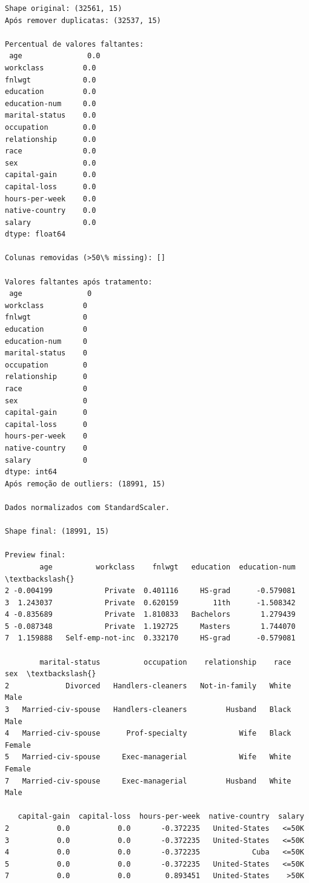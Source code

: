 \documentclass[11pt]{article}
\begin{document}
    \begin{Verbatim}[commandchars=\\\{\}]
Shape original: (32561, 15)
Após remover duplicatas: (32537, 15)

Percentual de valores faltantes:
 age               0.0
workclass         0.0
fnlwgt            0.0
education         0.0
education-num     0.0
marital-status    0.0
occupation        0.0
relationship      0.0
race              0.0
sex               0.0
capital-gain      0.0
capital-loss      0.0
hours-per-week    0.0
native-country    0.0
salary            0.0
dtype: float64

Colunas removidas (>50\% missing): []

Valores faltantes após tratamento:
 age               0
workclass         0
fnlwgt            0
education         0
education-num     0
marital-status    0
occupation        0
relationship      0
race              0
sex               0
capital-gain      0
capital-loss      0
hours-per-week    0
native-country    0
salary            0
dtype: int64
Após remoção de outliers: (18991, 15)

Dados normalizados com StandardScaler.

Shape final: (18991, 15)

Preview final:
        age          workclass    fnlwgt   education  education-num  \textbackslash{}
2 -0.004199            Private  0.401116     HS-grad      -0.579081
3  1.243037            Private  0.620159        11th      -1.508342
4 -0.835689            Private  1.810833   Bachelors       1.279439
5 -0.087348            Private  1.192725     Masters       1.744070
7  1.159888   Self-emp-not-inc  0.332170     HS-grad      -0.579081

        marital-status          occupation    relationship    race      sex  \textbackslash{}
2             Divorced   Handlers-cleaners   Not-in-family   White     Male
3   Married-civ-spouse   Handlers-cleaners         Husband   Black     Male
4   Married-civ-spouse      Prof-specialty            Wife   Black   Female
5   Married-civ-spouse     Exec-managerial            Wife   White   Female
7   Married-civ-spouse     Exec-managerial         Husband   White     Male

   capital-gain  capital-loss  hours-per-week  native-country  salary
2           0.0           0.0       -0.372235   United-States   <=50K
3           0.0           0.0       -0.372235   United-States   <=50K
4           0.0           0.0       -0.372235            Cuba   <=50K
5           0.0           0.0       -0.372235   United-States   <=50K
7           0.0           0.0        0.893451   United-States    >50K
    \end{Verbatim}
\end{document}

